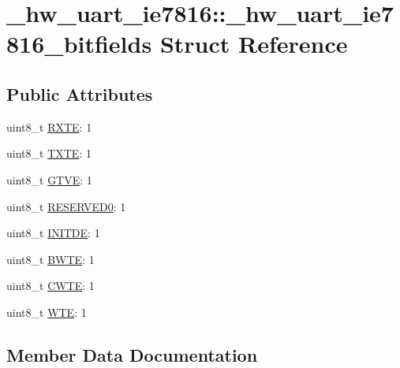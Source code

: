 \hypertarget{struct__hw__uart__ie7816_1_1__hw__uart__ie7816__bitfields}{}\section{\+\_\+hw\+\_\+uart\+\_\+ie7816\+:\+:\+\_\+hw\+\_\+uart\+\_\+ie7816\+\_\+bitfields Struct Reference}
\label{struct__hw__uart__ie7816_1_1__hw__uart__ie7816__bitfields}
\subsection*{Public Attributes}
\begin{DoxyCompactItemize}
\item 
uint8\+\_\+t \hyperlink{struct__hw__uart__ie7816_1_1__hw__uart__ie7816__bitfields_acbec7f34d6e6c6d2e47cac0d7d92cdda}{R\+X\+TE}\+: 1
\item 
uint8\+\_\+t \hyperlink{struct__hw__uart__ie7816_1_1__hw__uart__ie7816__bitfields_a5463b17e6c18622927645fb997a1b27e}{T\+X\+TE}\+: 1
\item 
uint8\+\_\+t \hyperlink{struct__hw__uart__ie7816_1_1__hw__uart__ie7816__bitfields_a34f22cc5b8377f08753332f7dea50d76}{G\+T\+VE}\+: 1
\item 
uint8\+\_\+t \hyperlink{struct__hw__uart__ie7816_1_1__hw__uart__ie7816__bitfields_a0f8486466177189de2ee80bc62b44fed}{R\+E\+S\+E\+R\+V\+E\+D0}\+: 1
\item 
uint8\+\_\+t \hyperlink{struct__hw__uart__ie7816_1_1__hw__uart__ie7816__bitfields_aab5194777620fc31e0eae4112a4995c8}{I\+N\+I\+T\+DE}\+: 1
\item 
uint8\+\_\+t \hyperlink{struct__hw__uart__ie7816_1_1__hw__uart__ie7816__bitfields_aea6973c26254be9437b72372bbae9e13}{B\+W\+TE}\+: 1
\item 
uint8\+\_\+t \hyperlink{struct__hw__uart__ie7816_1_1__hw__uart__ie7816__bitfields_a7367a6de7815586c96227a5b79d02563}{C\+W\+TE}\+: 1
\item 
uint8\+\_\+t \hyperlink{struct__hw__uart__ie7816_1_1__hw__uart__ie7816__bitfields_a3ace7e918678213cd2e9ab11c9e9e064}{W\+TE}\+: 1
\end{DoxyCompactItemize}


\subsection{Member Data Documentation}
